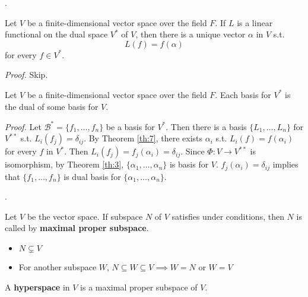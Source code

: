 \documentclass[8pt]{beamer}
\newcommand{\mc}[1]{\mathcal{#1}}
\newcommand{\tb}[1]{\textbf{#1}}
\newcommand{\ti}[1]{\textit{#1}}
\begin{document}
\begin{frame}{.}
    \begin{corollary}
        Let $V$ be a finite-dimensional vector space over the field $F$.
        If $L$ is a linear functional on the dual space $V^\ast$ of $V$, then there is a unique vector $\alpha$ in $V$ s.t.
        \[
            L(f) = f(\alpha)
        \]
        for every $f \in V^\ast$.
    \end{corollary}
    \ti{Proof.}
    Skip.
    \begin{corollary}
        Let $V$ be a finite-dimensional vector space over the field $F$.
        Each basis for $V^\ast$ is the dual of some basis for $V$.
    \end{corollary}
    \ti{Proof.}
    Let $\mc{B}^\ast = \{f_1, \dots, f_n\}$ be a basis for $V^\ast$.
    Then there is a basis $\{L_1, \dots, L_n\}$ for $V^{\ast\ast}$ s.t. $L_{i} (f_j) = \delta_{ij}$.
    By Theorem \ref{th:7}, there exists $\alpha_i$ s.t. $L_i(f) = f(\alpha_i)$ for every $f$ in $V^\ast$.
    Then $L_{i}(f_j) = f_j(\alpha_i) = \delta_{ij}$.
    Since $\Phi: V \to V^{\ast\ast}$ is isomorphism, by Theorem \ref{th:3}, $\{\alpha_1, \dots, \alpha_n\}$ is basis for $V$.
    $f_j(\alpha_i) = \delta_{ij}$ implies that $\{f_1, \dots, f_n\}$ is dual basis for $\{\alpha_1, \dots, \alpha_n\}$.
\end{frame}

\begin{frame}{.}
    \begin{definition}
        Let $V$ be the vector space. If subspace $N$ of $V$ satisfies under conditions, then $N$ is called by \tb{maximal proper subspace}.
        \begin{itemize}
            \item $N \subsetneq V$
            \item For another subspace $W$, $N \subseteq W \subseteq V \implies W=N$ or $W =V$
        \end{itemize}

        A \tb{hyperspace} in $V$ is a maximal proper subspace of $V$.
    \end{definition}
\end{frame}
\end{document}
